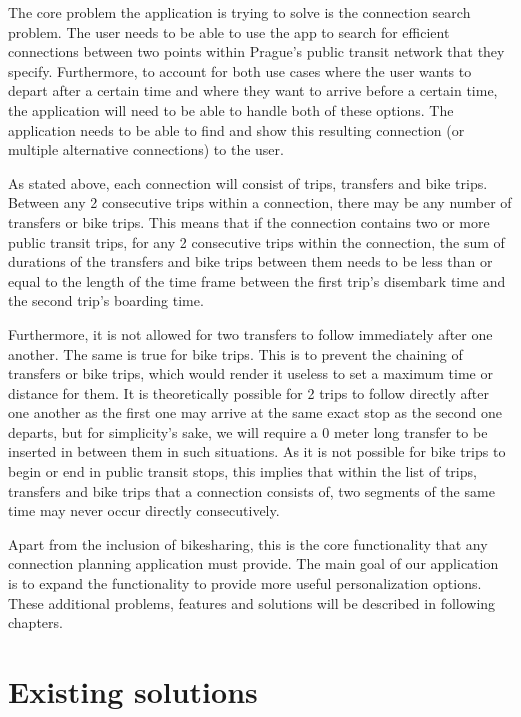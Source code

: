 The core problem the application is trying to solve is the connection search problem. The user needs to be able to use the app to search for efficient connections between two points within Prague's public transit network that they specify. Furthermore, to account for both use cases where the user wants to depart after a certain time and where they want to arrive before a certain time, the application will need to be able to handle both of these options. The application needs to be able to find and show this resulting connection (or multiple alternative connections) to the user.

As stated above, each connection will consist of trips, transfers and bike trips. Between any 2 consecutive trips within a connection, there may be any number of transfers or bike trips. This means that if the connection contains two or more public transit trips, for any 2 consecutive trips within the connection, the sum of durations of the transfers and bike trips between them needs to be less than or equal to the length of the time frame between the first trip's disembark time and the second trip's boarding time.

Furthermore, it is not allowed for two transfers to follow immediately after one another. The same is true for bike trips. This is to prevent the chaining of transfers or bike trips, which would render it useless to set a maximum time or distance for them. It is theoretically possible for 2 trips to follow directly after one another as the first one may arrive at the same exact stop as the second one departs, but for simplicity's sake, we will require a 0 meter long transfer to be inserted in between them in such situations. As it is not possible for bike trips to begin or end in public transit stops, this implies that within the list of trips, transfers and bike trips that a connection consists of, two segments of the same time may never occur directly consecutively.

Apart from the inclusion of bikesharing, this is the core functionality that any connection planning application must provide. The main goal of our application is to expand the functionality to provide more useful personalization options. These additional problems, features and solutions will be described in following chapters.

\section{Existing solutions}

